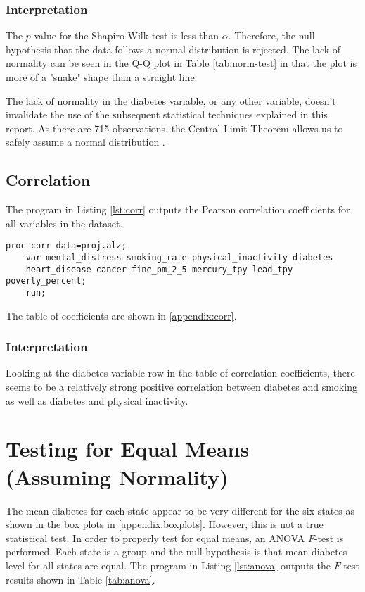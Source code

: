 \documentclass{article}
\begin{document}
\subsubsection{Interpretation} \label{normality-interpretation}
The $p$-value for the Shapiro-Wilk test is less than $\alpha$. Therefore, the null hypothesis that the data follows a normal distribution is rejected. The lack of normality can be seen in the Q-Q plot in Table \ref{tab:norm-test} in that the plot is more of a "snake" shape than a straight line.

The lack of normality in the diabetes variable, or any other variable, doesn't invalidate the use of the subsequent statistical techniques explained in this report. As there are 715 observations, the Central Limit Theorem allows us to safely assume a normal distribution \cite{Ott_Longnecker_2016}.

\subsection{Correlation}
The program in Listing \ref{lst:corr} outputs the Pearson correlation coefficients for all variables in the dataset.

\begin{lstlisting}[language=SAS,caption=SAS correlation program,captionpos=b,label=lst:corr]
    proc corr data=proj.alz;
    var mental_distress	smoking_rate physical_inactivity diabetes
    heart_disease cancer fine_pm_2_5 mercury_tpy lead_tpy poverty_percent;
    run;
\end{lstlisting}

The table of coefficients are shown in \ref{appendix:corr}.

\subsubsection{Interpretation}
Looking at the diabetes variable row in the table of correlation coefficients, there seems to be a relatively strong positive correlation between diabetes and smoking as well as diabetes and physical inactivity. 

\section{Testing for Equal Means (Assuming Normality)}

The mean diabetes for each state appear to be very different for the six states as shown in the box plots in \ref{appendix:boxplots}. However, this is not a true statistical test. In order to properly test for equal means, an ANOVA $F$-test is performed. Each state is a group and the null hypothesis is that mean diabetes level for all states are equal. The program in Listing \ref{lst:anova} outputs the $F$-test results shown in Table \ref{tab:anova}.
\end{document}
